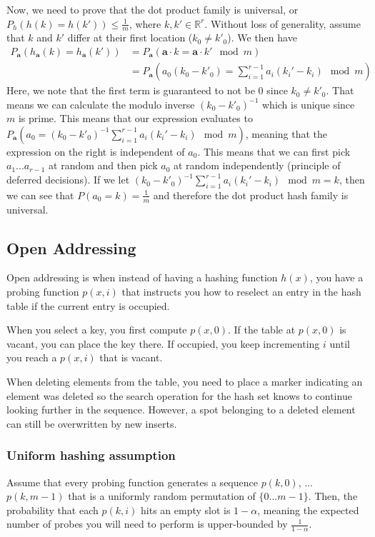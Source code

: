 \documentclass[10pt]{article}
\begin{document}
Now, we need to prove that the dot product family is universal, or $P_h(h(k) = h(k')) \leq \frac{1}{m}$, where $k, k' \in \mathbb{R}^r$. Without loss of generality, assume that $k$ and $k'$ differ at their first location ($k_0 \neq k'_0$). We then have
\begin{align*}
    P_\mathbf{a}(h_\mathbf{a}(k) = h_\mathbf{a} (k')) &= P_\mathbf{a} (\mathbf{a} \cdot k = \mathbf{a} \cdot k' \mod m)\\
    &= P_\mathbf{a} (a_0 (k_0 - k'_0) = \sum_{i=1}^{r-1} a_i (k_i' - k_i) \mod m)
\end{align*}
Here, we note that the first term is guaranteed to not be 0 since $k_0 \neq k'_0$. That means we can calculate the modulo inverse $(k_0 - k'_0)^{-1}$ which is unique since $m$ is prime. This means that our expression evaluates to $P_\mathbf{a} (a_0 = (k_0 - k'_0)^{-1} \sum_{i=1}^{r-1} a_i (k_i' - k_i) \mod m)$, meaning that the expression on the right is independent of $a_0$. This means that we can first pick $a_1 ... a_{r-1}$ at random and then pick $a_0$ at random independently (principle of deferred decisions). If we let $(k_0 - k'_0)^{-1} \sum_{i=1}^{r-1} a_i (k_i' - k_i) \mod m = k$, then we can see that $P(a_0 = k) = \frac{1}{m}$ and therefore the dot product hash family is universal.
\subsection*{Open Addressing}
Open addressing is when instead of having a hashing function $h(x)$, you have a probing function $p(x, i)$ that instructs you how to reselect an entry in the hash table if the current entry is occupied.

When you select a key, you first compute $p(x, 0)$. If the table at $p(x, 0)$ is vacant, you can place the key there. If occupied, you keep incrementing $i$ until you reach a $p(x, i)$ that is vacant.

When deleting elements from the table, you need to place a marker indicating an element was deleted so the search operation for the hash set knows to continue looking further in the sequence. However, a spot belonging to a deleted element can still be overwritten by new inserts.
\subsubsection*{Uniform hashing assumption}
Assume that every probing function generates a sequence $p(k, 0)$, ... $p(k, m-1)$ that is a uniformly random permutation of $\{0 ... m-1\}$. Then, the probability that each $p(k, i)$ hits an empty slot is $1 - \alpha$, meaning the expected number of probes you will need to perform is upper-bounded by $\frac{1}{1 - \alpha}$.
\end{document}
